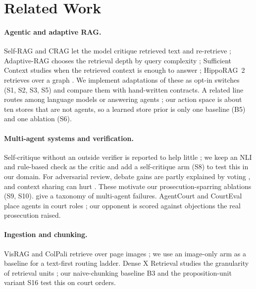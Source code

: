 \section{Related Work}
\label{sec:related}

\paragraph{Agentic and adaptive RAG.} Self-RAG and CRAG let the model critique retrieved text and re-retrieve \citep{asai2024selfrag,yan2024crag}; Adaptive-RAG chooses the retrieval depth by query complexity \citep{jeong2024adaptive}; Sufficient Context studies when the retrieved context is enough to answer \citep{joren2025sufficient}; HippoRAG~2 retrieves over a graph \citep{gutierrez2025hipporag2}. We implement adaptations of these as opt-in switches (S1, S2, S3, S5) and compare them with hand-written contracts. A related line routes among language models or answering agents \citep{zhang2026agentrouter}; our action space is about ten stores that are not agents, so a learned store prior is only one baseline (B5) and one ablation (S6).

\paragraph{Multi-agent systems and verification.} Self-critique without an outside verifier is reported to help little \citep{gou2024critic,huang2024selfcorrect}; we keep an NLI and rule-based check as the critic and add a self-critique arm (S8) to test this in our domain. For adversarial review, debate gains are partly explained by voting \citep{choi2025debate}, and context sharing can hurt \citep{wynn2025talk}. These motivate our prosecution-sparring ablations (S9, S10). \citet{cemri2025mast} give a taxonomy of multi-agent failures. AgentCourt and CourtEval place agents in court roles \citep{chen2025agentcourt,kumar2025courtevel}; our opponent is scored against objections the real prosecution raised.

\paragraph{Ingestion and chunking.} VisRAG and ColPali retrieve over page images \citep{yu2025visrag,faysse2025colpali}; we use an image-only arm as a baseline for a text-first routing ladder. Dense X Retrieval studies the granularity of retrieval units \citep{chen2024densex}; our naive-chunking baseline B3 and the proposition-unit variant S16 test this on court orders.

